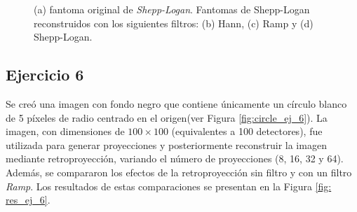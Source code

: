 \documentclass[11pt, twocolumn]{article}
\begin{document}
\begin{figure}[H]
    \centering
    \hfill
    \hfill
    \hfill
    \hfill
    \caption{(a) fantoma original de \textit{Shepp-Logan}. Fantomas de Shepp-Logan reconstruidos con los siguientes filtros: (b) Hann, (c) Ramp y (d) Shepp-Logan.}
    \label{fig:reconstruccion_ruido}
\end{figure}

\subsection*{Ejercicio 6}
Se creó una imagen con fondo negro que contiene únicamente un círculo blanco de 5 píxeles de radio centrado en el origen(ver Figura \ref{fig:circle_ej_6}). La imagen, con dimensiones de $100\times100$ (equivalentes a 100 detectores), fue utilizada para generar proyecciones y posteriormente reconstruir la imagen mediante retroproyección, variando el número de proyecciones (8, 16, 32 y 64). Además, se compararon los efectos de la retroproyección sin filtro y con un filtro \textit{Ramp}. Los resultados de estas comparaciones se presentan en la Figura \ref{fig: res_ej_6}.
\end{document}
